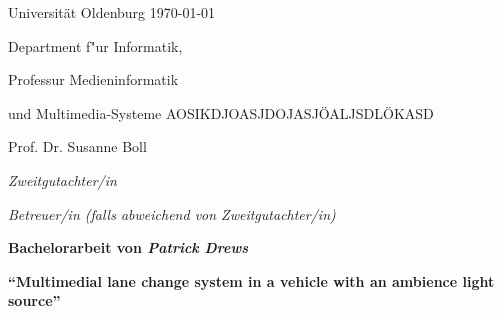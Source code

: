 \documentclass[a4paper, 11pt]{article}
\newcommand{\KandidatIn}{\emph{Patrick Drews}}
\newcommand{\Titel}{Multimedial lane change system in a vehicle with an ambience light source} %
\newcommand{\GutachterIn}{Prof. Dr. Susanne Boll}%
\newcommand{\ZweitgutachterIn}{\emph{Zweitgutachter/in}} %
\newcommand{\BetreuerIn}{\emph{Betreuer/in (falls abweichend von Zweitgutachter/in)}} %
\newcommand{\Arbeitstyp}{Bachelorarbeit}
\begin{document}



Universit\"{a}t Oldenburg \hfill \today

Department f"{u}r Informatik,

Professur Medieninformatik 

und Multimedia-Systeme AOSIKDJOASJDOJASJÖALJSDLÖKASD

\GutachterIn{}

\ZweitgutachterIn{}

\BetreuerIn{}\newline

\begin{center}

  \large{\bf \Arbeitstyp{} von \KandidatIn{}}

  \vspace*{0.5cm}

 \large{\bf "`\Titel"'}

\end{center}

\setlength{\parskip}{1.5ex plus0.5ex minus 0.5ex}

\end{document}
